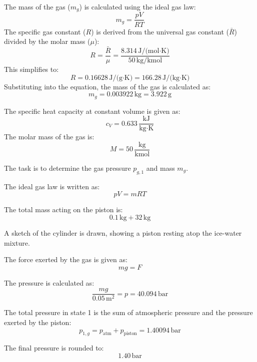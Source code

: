 The mass of the gas (\( m_g \)) is calculated using the ideal gas law:  
\[
m_g = \frac{p V}{R T}
\]  
The specific gas constant (\( R \)) is derived from the universal gas constant (\( \bar{R} \)) divided by the molar mass (\( \mu \)):  
\[
R = \frac{\bar{R}}{\mu} = \frac{8.314 \, \text{J/(mol·K)}}{50 \, \text{kg/kmol}}
\]  
This simplifies to:  
\[
R = 0.16628 \, \text{J/(g·K)} = 166.28 \, \text{J/(kg·K)}
\]  
Substituting into the equation, the mass of the gas is calculated as:  
\[
m_g = 0.003922 \, \text{kg} = 3.922 \, \text{g}
\]

The specific heat capacity at constant volume is given as:  
\[
c_V = 0.633 \, \frac{\text{kJ}}{\text{kg·K}}
\]  
The molar mass of the gas is:  
\[
M = 50 \, \frac{\text{kg}}{\text{kmol}}
\]  

The task is to determine the gas pressure \( p_{g,1} \) and mass \( m_g \).  

The ideal gas law is written as:  
\[
pV = mRT
\]  

The total mass acting on the piston is:  
\[
0.1 \, \text{kg} + 32 \, \text{kg}
\]  

A sketch of the cylinder is drawn, showing a piston resting atop the ice-water mixture.  

The force exerted by the gas is given as:  
\[
mg = F
\]  

The pressure is calculated as:  
\[
\frac{mg}{0.05 \, \text{m}^2} = p = 40.094 \, \text{bar}
\]  

The total pressure in state 1 is the sum of atmospheric pressure and the pressure exerted by the piston:  
\[
p_{1,g} = p_{\text{atm}} + p_{\text{piston}} = 1.40094 \, \text{bar}
\]  

The final pressure is rounded to:  
\[
1.40 \, \text{bar}
\]
